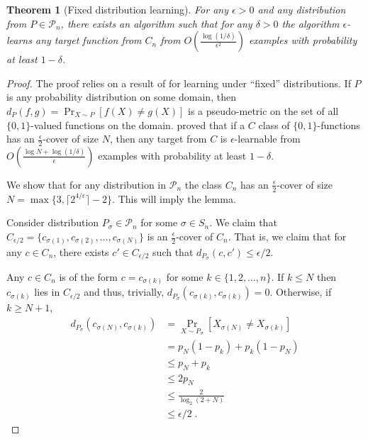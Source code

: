 \documentclass[10pt]{article}
\newtheorem{theorem}[proposition]{Theorem}
\renewcommand{\P}{\mathcal{P}}
\begin{document}
\begin{theorem}[Fixed distribution learning]
For any $\epsilon > 0$ and any distribution from $P \in \P_n$,
there exists an algorithm such that for any $\delta > 0$
the algorithm $\epsilon$-learns any target function
from $C_n$ from $O \left( \frac{\log(1/\delta)}{\epsilon^2} \right)$
examples with probability at least $1 - \delta$.
\end{theorem}

\begin{proof}
The proof relies on a result of \cite{Benedek-Itai-1991} for learning under
``fixed'' distributions. If $P$ is any probability distribution on some domain,
then $d_P(f,g) = \Pr_{X \sim P}[f(X) \neq g(X)]$ is a pseudo-metric on the set of all
$\{0,1\}$-valued functions on the domain. \cite{Benedek-Itai-1991} proved that
if a $C$ class of $\{0,1\}$-functions has an $\frac{\epsilon}{2}$-cover of size
$N$, then any target from $C$ is $\epsilon$-learnable from $O
\left( \frac{\log N + \log (1/\delta)}{\epsilon}\right)$ examples
with probability at least $1-\delta$.

We show that for any distribution in $\P_n$ the class $C_n$ has an $\frac{\epsilon}{2}$-cover of size
$N = \max\{3, \lceil 2^{4/\epsilon}\rceil  - 2 \}$. This will imply the lemma.

Consider distribution $P_{\sigma} \in \P_n$ for some $\sigma \in S_n$.
We claim that $C_{\epsilon/2} = \{ c_{\sigma(1)},
c_{\sigma(2)}, \dots, c_{\sigma(N)} \}$ is an $\frac{\epsilon}{2}$-cover of
$C_n$. That is, we claim that for any $c \in C_n$, there exists $c' \in
C_{\epsilon/2}$ such that $d_{P_{\sigma}}(c,c') \le \epsilon/2$.

Any $c \in C_n$ is of the form $c = c_{\sigma(k)}$ for some $k \in \{1,2,\dots,n\}$.
If $k \le N$ then $c_{\sigma(k)}$ lies in $C_{\epsilon/2}$ and thus, trivially, $d_{P_{\sigma}}(c_{\sigma(k)},c_{\sigma(k)}) = 0$.
Otherwise, if  $k \ge N + 1$,
\begin{align*}
d_{P_{\sigma}}(c_{\sigma(N)}, c_{\sigma(k)})
& = \Pr_{X \sim P_{\sigma}}[X_{\sigma(N)} \neq X_{\sigma(k)} ] \\
& = p_N (1 - p_k) + p_k (1 - p_N) \\
& \le p_N + p_k \\
& \le 2 p_N \\
& \le \frac{2}{\log_2(2 + N)} \\
& \le \epsilon/2 \; .
\end{align*}
\end{proof}
\end{document}
